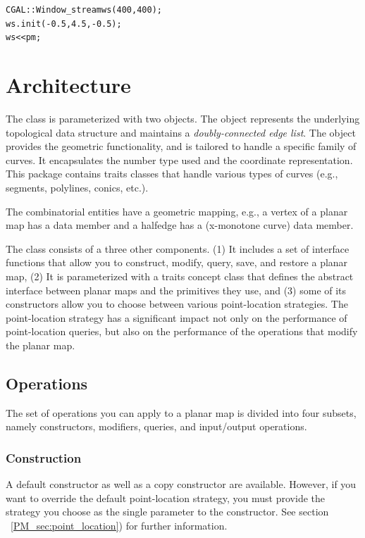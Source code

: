 \begin{alltt}
  CGAL::Window_stream ws(400, 400);
  ws.init(-0.5, 4.5, -0.5);
  ws << pm;
\end{alltt}

\section{Architecture}
The  class is parameterized with two
objects. The  object represents the underlying topological
data structure and maintains a {\em doubly-connected edge list}. The
 object provides the geometric functionality, and is
tailored to handle a specific family of curves. It encapsulates the
number type used and the coordinate representation. This package
contains traits classes that handle various types of curves (e.g.,
segments, polylines, conics, etc.).

The combinatorial entities have a geometric mapping, e.g.,
a vertex of a planar map has a  data member and a halfedge
has a  (x-monotone curve) data member.

The  class consists of a three other
components. (1) It includes a set of interface functions that allow
you to construct, modify, query, save, and restore a planar map,
(2) It is parameterized with a traits concept class that defines the
abstract interface between planar maps and the primitives they use,
and (3) some of its constructors allow you to choose between
various point-location strategies. The point-location strategy has a
significant impact not only on the performance of point-location
queries, but also on the performance of the operations that modify the
planar map.

\subsection{Operations}
The set of operations you can apply to a planar map is divided into
four subsets, namely constructors, modifiers, queries, and
input/output operations. 

\subsubsection{Construction}
A default constructor as well as a copy constructor are
available. However, if you want to override the default point-location
strategy, you must provide the strategy you choose as the single
parameter to the constructor. See section
~\ref{PM_sec:point_location}) for further information.

